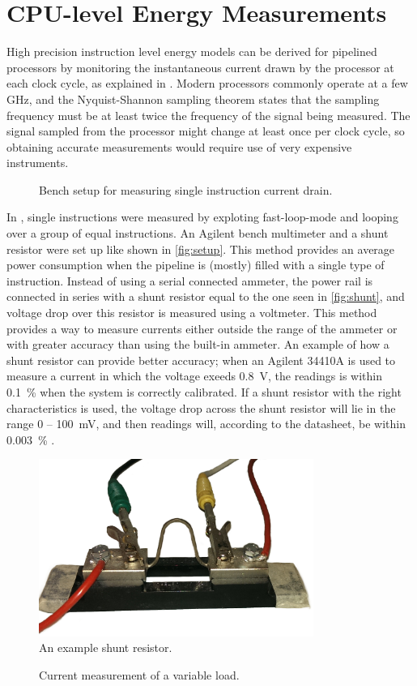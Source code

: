 \section{CPU-level Energy Measurements}
\label{sec:energymeasure}

High precision instruction level energy models can be derived for pipelined
processors by monitoring the instantaneous current drawn by the processor at
each clock cycle, as explained in \cite{nikolaidis2005instruction}. Modern
processors commonly operate at a few GHz, and the Nyquist-Shannon sampling theorem
\cite{nyquist1928certain} states that the sampling frequency must be at least
twice the frequency of the signal being measured. The signal sampled from the
processor might change at least once per clock cycle, so obtaining accurate
measurements would require use of very expensive instruments.

\begin{figure}[tbh]
    \centering
    
    \caption{Bench setup for measuring single instruction current drain.}
    \label{fig:setup}
\end{figure}

In \cite{rundehvatum2013exploring}, single instructions were measured by
exploting fast-loop-mode and looping over a group of equal instructions. An
Agilent bench multimeter and a shunt resistor were set up like shown in
\autoref{fig:setup}. This method provides an average power consumption when the
pipeline is (mostly) filled with a single type of instruction. Instead of using
a serial connected ammeter, the power rail is connected in series with a shunt
resistor equal to the one seen in \autoref{fig:shunt}, and voltage drop over
this resistor is measured using a voltmeter. This method provides a way to
measure currents either outside the range of the ammeter or with greater
accuracy than using the built-in ammeter. An example of how a shunt resistor can
provide better accuracy; when an Agilent 34410A is used to measure a current in
which the voltage exeeds 0.8~V, the readings is within 0.1~\% when the system is
correctly calibrated. If a shunt resistor with the right characteristics is
used, the voltage drop across the shunt resistor will lie in the range 0 --
100~mV, and then readings will, according to the datasheet, be within 0.003~\%
\cite{agilent34410a}.

\begin{figure}[tbh]
    \centering
    \includegraphics[width=0.8\textwidth]{figs/shunt.jpg}
    \caption{An example shunt resistor.}
    \label{fig:shunt}
\end{figure}

\begin{figure}[tbh]
    \centering
    
    \caption{Current measurement of a variable load.}
    \label{fig:varcurrent}
\end{figure}


